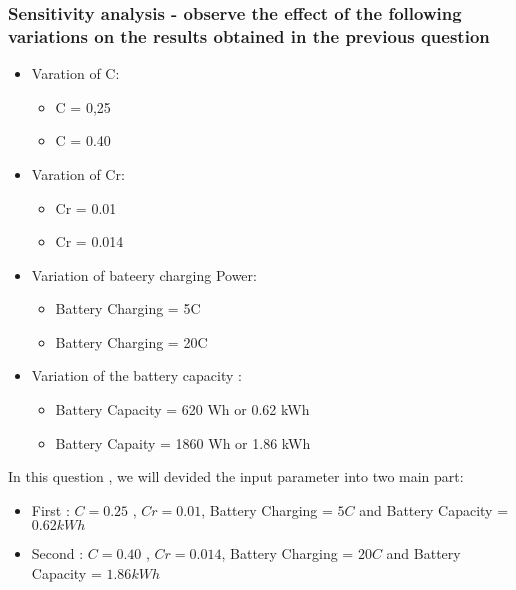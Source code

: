 \documentclass[12pt,a4paper]{article}
\numberwithin{equation}{section}
\begin{document}
\subsubsection{Sensitivity analysis - observe the effect of the following variations on the results obtained in the previous question}
\begin{itemize}
	\item Varation of C:
	\begin{itemize}
		\item C = 0,25
		\item C = 0.40
	\end{itemize}

	\item Varation of Cr:
	\begin{itemize}
		\item Cr = 0.01
		\item Cr = 0.014
	\end{itemize}

	\item Variation of bateery charging Power:
	\begin{itemize}
		\item Battery Charging = 5C
		\item Battery Charging = 20C
	\end{itemize}

	\item Variation of the battery capacity :
	
	\begin{itemize}
		\item Battery Capacity  = 620 Wh or 0.62 kWh
		\item Battery Capaity = 1860 Wh or 1.86 kWh
	\end{itemize}
\end{itemize}


In this question , we will devided the input parameter into two main part: 

\begin{itemize}
	\item First : $C = 0.25$ , $Cr = 0.01$, Battery Charging = $5C$ and Battery Capacity = $0.62 kWh$
	\item Second : $C = 0.40$ , $Cr = 0.014$, Battery Charging = $20C$ and Battery Capacity = $1.86 kWh$
\end{itemize}
\end{document}
